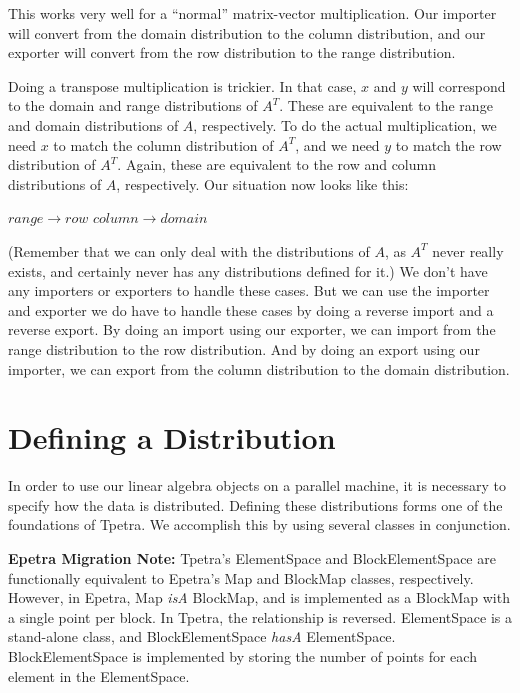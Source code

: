 \documentclass[10pt,relax]{TpetraDesign}
\begin{document}
This works very well for a ``normal'' matrix-vector multiplication. Our importer will convert from the domain distribution to the column distribution, and our exporter will convert from the row distribution to the range distribution. 

Doing a transpose multiplication is trickier. In that case, $x$ and $y$ will correspond to the domain and range distributions of $A^T$. These are equivalent to the range and domain distributions of $A$, respectively. To do the actual multiplication, we need $x$ to match the column distribution of $A^T$, and we need $y$ to match the row distribution of $A^T$. Again, these are equivalent to the row and column distributions of $A$, respectively. Our situation now looks like this:
\begin{center}
$range  \rightarrow row$
\hspace{1cm}
$column \rightarrow domain$
\end{center}

(Remember that we can only deal with the distributions of $A$, as $A^T$ never really exists, and certainly never has any distributions defined for it.) We don't have any importers or exporters to handle these cases. But we can use the importer and exporter we do have to handle these cases by doing a reverse import and a reverse export. By doing an import using our exporter, we can import from the range distribution to the row distribution. And by doing an export using our importer, we can export from the column distribution to the domain distribution.

%
\section{Defining a Distribution}
In order to use our linear algebra objects on a parallel machine, it is necessary to specify how the data is distributed. Defining these distributions forms one of the foundations of Tpetra. We accomplish this by using several classes in conjunction.

\textbf{Epetra Migration Note:} Tpetra's ElementSpace and BlockElementSpace are functionally equivalent to Epetra's Map and BlockMap classes, respectively. However, in Epetra, Map \emph{isA} BlockMap, and is implemented as a BlockMap with a single point per block. In Tpetra, the relationship is reversed. ElementSpace is a stand-alone class, and BlockElementSpace \emph{hasA} ElementSpace. BlockElementSpace is implemented by storing the number of points for each element in the ElementSpace.
\end{document}
